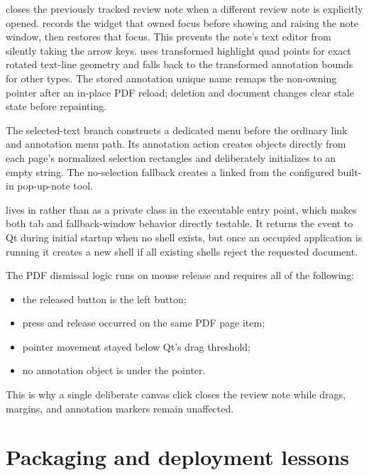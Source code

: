  closes the previously tracked review note when a different review note is explicitly opened.
 records the widget that owned focus before showing and raising the note window, then restores that focus.
This prevents the note's text editor from silently taking the arrow keys.
 uses transformed highlight quad points for exact rotated text-line geometry and falls back to the transformed annotation bounds for other types.
The stored annotation unique name remaps the non-owning pointer after an in-place PDF reload; deletion and document changes clear stale state before repainting.

The selected-text branch constructs a dedicated menu before the ordinary link and annotation menu path.
Its annotation action creates  objects directly from each page's normalized selection rectangles and deliberately initializes  to an empty string.
The no-selection fallback creates a linked  from the configured built-in pop-up-note tool.

 lives in  rather than as a private class in the executable entry point, which makes both tab and fallback-window behavior directly testable.
It returns the event to Qt during initial startup when no shell exists, but once an occupied application is running it creates a new shell if all existing shells reject the requested document.

The PDF dismissal logic runs on mouse release and requires all of the following:
\begin{itemize}
  \item the released button is the left button;
  \item press and release occurred on the same PDF page item;
  \item pointer movement stayed below Qt's drag threshold;
  \item no annotation object is under the pointer.
\end{itemize}
This is why a single deliberate canvas click closes the review note while drags, margins, and annotation markers remain unaffected.


\section*{Packaging and deployment lessons}


